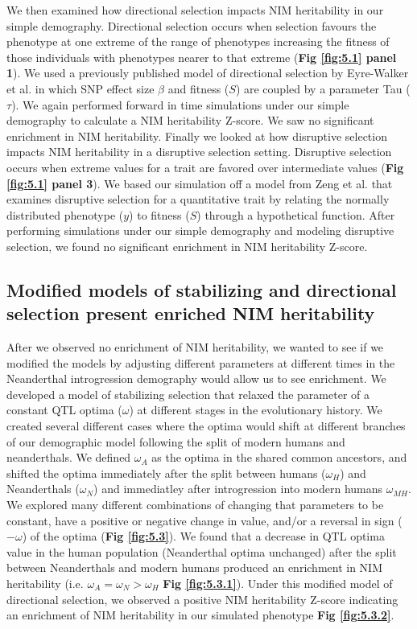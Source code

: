 We then examined how directional selection impacts NIM heritability in our simple demography. Directional selection occurs when selection favours the phenotype at one extreme of the range of phenotypes increasing the fitness of those individuals with phenotypes nearer to that extreme (\textbf{Fig \ref{fig:5.1} panel 1}). We used a previously published model of directional selection by Eyre-Walker et al. \cite{eyre2010genetic} in which SNP effect size $\beta$ and fitness ($S$) are coupled by a parameter Tau ($\tau$). We again performed forward in time simulations under our simple demography to calculate a NIM heritability Z-score. We saw no significant enrichment in NIM heritability.
Finally we looked at how disruptive selection impacts NIM heritability in a disruptive selection setting. Disruptive selection occurs when extreme values for a trait are favored over intermediate values (\textbf{Fig \ref{fig:5.1} panel 3}). We based our simulation off a model from Zeng et al. that examines disruptive selection for a quantitative trait by relating the normally distributed phenotype ($y$) to fitness ($S$) through a hypothetical function. After performing simulations under our simple demography and modeling disruptive selection, we found no significant enrichment in NIM heritability Z-score. 
\subsection{Modified models of stabilizing and directional selection present enriched NIM heritability}
After we observed no enrichment of NIM heritability, we wanted to see if we modified the models by adjusting different parameters at different times in the Neanderthal introgression demography would allow us to see enrichment. We developed a model of stabilizing selection that relaxed the parameter of a constant QTL optima ($\omega$) at different stages in the evolutionary history. We created several different cases where the optima would shift at different branches of our demographic model following the split of modern humans and neanderthals. We defined $\omega_A$ as the optima in the shared common ancestors, and shifted the optima immediately after the split between humans ($\omega_H$) and Neanderthals ($\omega_{N}$) and immediatley after introgression into modern humans $\omega_{MH}$. We explored many different combinations of changing that parameters to be constant, have a positive or negative change in value, and/or a reversal in sign ($-\omega$) of the optima (\textbf{Fig \ref{fig:5.3}}). We found that a decrease in QTL optima value in the human population (Neanderthal optima unchanged) after the split between Neanderthals and modern humans produced an enrichment in NIM heritability (i.e. $\omega_A = \omega_N > \omega_H$ \textbf{Fig \ref{fig:5.3.1}}). Under this modified model of directional selection, we observed a positive NIM heritability Z-score indicating an enrichment of NIM heritability in our simulated phenotype \textbf{Fig \ref{fig:5.3.2}}.


